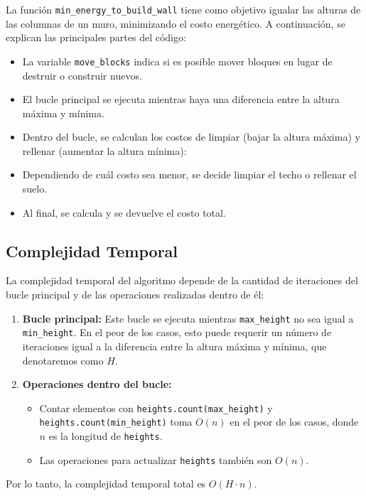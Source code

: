 \documentclass[a4paper,12pt]{article}
\begin{document}
La función \texttt{min\_energy\_to\_build\_wall} tiene como objetivo igualar las alturas de las columnas de un muro, minimizando el costo energético. A continuación, se explican las principales partes del código:

\begin{itemize}
	\item La variable \texttt{move\_blocks} indica si es posible mover bloques en lugar de destruir o construir nuevos.
	\item El bucle principal se ejecuta mientras haya una diferencia entre la altura máxima y mínima.
	\item Dentro del bucle, se calculan los costos de limpiar (bajar la altura máxima) y rellenar (aumentar la altura mínima):
	\item Dependiendo de cuál costo sea menor, se decide limpiar el techo o rellenar el suelo.
	\item Al final, se calcula y se devuelve el costo total.
\end{itemize}

\subsection{Complejidad Temporal}

La complejidad temporal del algoritmo depende de la cantidad de iteraciones del bucle principal y de las operaciones realizadas dentro de él:

\begin{enumerate}
	\item \textbf{Bucle principal:} Este bucle se ejecuta mientras \texttt{max\_height} no sea igual a \texttt{min\_height}. En el peor de los casos, esto puede requerir un número de iteraciones igual a la diferencia entre la altura máxima y mínima, que denotaremos como \( H \).
	\item \textbf{Operaciones dentro del bucle:}
	\begin{itemize}
		\item Contar elementos con \texttt{heights.count(max\_height)} y \texttt{heights.count(min\_height)} toma \( O(n) \) en el peor de los casos, donde \( n \) es la longitud de \texttt{heights}.
		\item Las operaciones para actualizar \texttt{heights} también son \( O(n) \).
	\end{itemize}
\end{enumerate}

Por lo tanto, la complejidad temporal total es \( O(H \cdot n) \).
\end{document}
